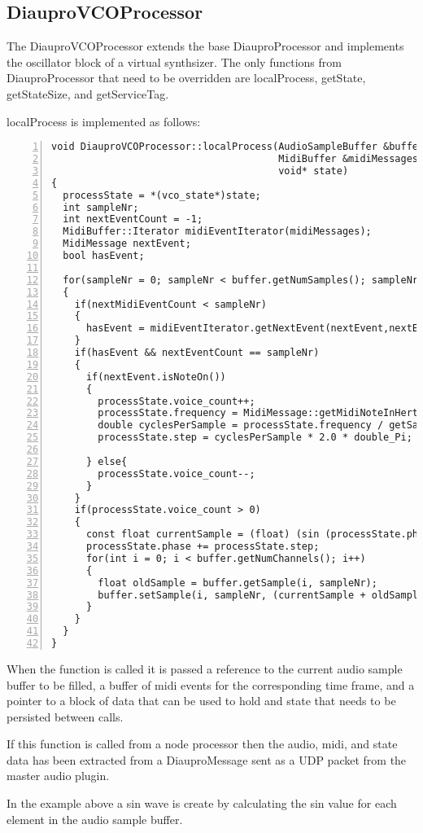 \subsection{DiauproVCOProcessor}

The DiauproVCOProcessor extends the base DiauproProcessor and implements the oscillator block of a virtual synthsizer. The only functions from DiauproProcessor that need to be overridden are localProcess, getState, getStateSize, and getServiceTag.

localProcess is implemented as follows:
\begin{lstlisting}[numbers=left]
void DiauproVCOProcessor::localProcess(AudioSampleBuffer &buffer,
                                       MidiBuffer &midiMessages,
                                       void* state)
{
  processState = *(vco_state*)state;
  int sampleNr;
  int nextEventCount = -1;
  MidiBuffer::Iterator midiEventIterator(midiMessages);
  MidiMessage nextEvent;
  bool hasEvent;

  for(sampleNr = 0; sampleNr < buffer.getNumSamples(); sampleNr++)
  {
    if(nextMidiEventCount < sampleNr)
    {
      hasEvent = midiEventIterator.getNextEvent(nextEvent,nextEventCount )
    }
    if(hasEvent && nextEventCount == sampleNr)
    {
      if(nextEvent.isNoteOn())
      {
        processState.voice_count++;
        processState.frequency = MidiMessage::getMidiNoteInHertz(nextEvent.getNoteNumber());
        double cyclesPerSample = processState.frequency / getSampleRate();
        processState.step = cyclesPerSample * 2.0 * double_Pi;

      } else{
        processState.voice_count--;
      }
    }
    if(processState.voice_count > 0)
    {
      const float currentSample = (float) (sin (processState.phase) * processState.level);
      processState.phase += processState.step;
      for(int i = 0; i < buffer.getNumChannels(); i++)
      {
        float oldSample = buffer.getSample(i, sampleNr);
        buffer.setSample(i, sampleNr, (currentSample + oldSample)*0.5);
      }
    }
  }
}
\end{lstlisting}

\noindent
When the function is called it is passed a reference to the current audio sample buffer to be filled, a buffer of midi events for the corresponding time frame, and a pointer to a block of data that can be used to hold and state that needs to be persisted between calls.

If this function is called from a node processor then the audio, midi, and state data has been extracted from a DiauproMessage sent as a UDP packet from the master audio plugin.

In the example above a sin wave is create by calculating the sin value for each element in the audio sample buffer.
